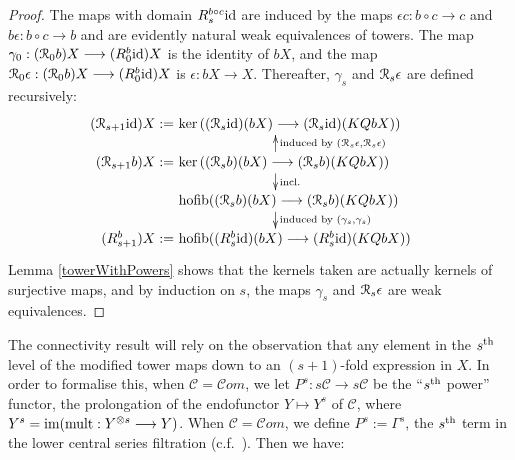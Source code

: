 \documentclass[11pt]{amsart} \renewcommand{\baselinestretch}{1.4}
\theoremstyle{plain}
\theoremstyle{definition}
\renewcommand{\ker}{\mathrm{ker}\,}
\DeclareMathOperator*{\hofib}{hofib}
\renewcommand{\to}{\longrightarrow}
\newcommand{\scrC}{\mathscr{C}}
\newcommand{\calR}{\mathcal{R}}
\newcommand{\calc}{\mathcal{C}}
\newcommand{\Id}{\mathrm{id}}
\newcommand{\algs}{{\scrC\!\textit{om}}}
\newcommand{\algcat}{{\calc}}%
\renewcommand{\mapsto}{\longmapsto}
\newcommand{\caldup}[1]{\calR_{\smash{#1}}}
\newcommand{\plainD}{R}
\newcommand{\barConstructionMightAbbreviate}{b}
\begin{document}
\begin{Bousfield-Kan spectral sequence}
\begin{proof}
The maps with domain $\plainD_{\smash{s}}^{\smash{\barConstructionMightAbbreviate \circ c}}\Id $ are induced by the maps $\epsilon c:\barConstructionMightAbbreviate \circ c\to c$ and $\barConstructionMightAbbreviate \epsilon:\barConstructionMightAbbreviate \circ c\to \barConstructionMightAbbreviate $ and are evidently natural weak equivalences of towers. The map $\gamma_0:(\caldup{0}\barConstructionMightAbbreviate )X\to (\plainD_{\smash{0}}^{\smash{\barConstructionMightAbbreviate }}\Id )X$ is the identity of $\barConstructionMightAbbreviate X$, and the map $\caldup{0}\epsilon:(\caldup{0}\barConstructionMightAbbreviate )X\to (\plainD_{\smash{0}}^{\smash{\barConstructionMightAbbreviate }}\Id )X$ is $\epsilon:\barConstructionMightAbbreviate X\to X$. Thereafter, $\gamma_s$ and $\caldup{s}\epsilon$ are defined recursively:
\[\qquad \quad \xymatrix@R=4mm{
\makebox[0cm][r]{$(\caldup{s+1}\Id )X:=\,$}\makebox[5cm][l]{$\,\ker((\caldup{s}\Id )(\barConstructionMightAbbreviate X)\to (\caldup{s}\Id )(KQ\barConstructionMightAbbreviate X))$}\\
\makebox[0cm][r]{$(\caldup{s+1}\barConstructionMightAbbreviate )X:=\,$}\makebox[5cm][l]{$\,\ker((\caldup{s}\barConstructionMightAbbreviate )(\barConstructionMightAbbreviate X)\to (\caldup{s}\barConstructionMightAbbreviate )(KQ\barConstructionMightAbbreviate X))$}\ar[d]^-{\textup{incl.}}_-{}%
\ar[u]_-{\textup{induced by }(\caldup{s}\epsilon,\caldup{s}\epsilon)}^-{}%
\\%
\makebox[5cm][l]{$\,\hofib((\caldup{s}\barConstructionMightAbbreviate )(\barConstructionMightAbbreviate X)\to(\caldup{s}\barConstructionMightAbbreviate )(KQ\barConstructionMightAbbreviate X))$}\ar[d]^-{\textup{induced by }(\gamma_{s},\gamma_{s})}_-{}%
\\%
\makebox[0cm][r]{$(\plainD_{\smash{s+1}}^{\smash{\barConstructionMightAbbreviate }})X:=\,$}\makebox[5cm][l]{$\,\hofib((\plainD_{\smash{s}}^{\smash{\barConstructionMightAbbreviate }}\Id )(\barConstructionMightAbbreviate X)\to (\plainD_{\smash{s}}^{\smash{\barConstructionMightAbbreviate }}\Id )(KQ\barConstructionMightAbbreviate X))$}%
}\]
\noindent Lemma \ref{towerWithPowers} shows that the kernels taken are actually kernels of surjective maps, and by induction on $s$, the maps $\gamma_s$ and $\caldup{s}\epsilon$ are weak equivalences.
\end{proof}
The connectivity result will rely on the observation that any element in the $s^\textup{th}$ level of the modified tower maps down to an $(s+1)$-fold expression in $X$. In order to formalise this, when $\algcat=\algs$, we let $P^s:s\algcat\to s\algcat$ be the ``$s^\textup{th}$ power'' functor, the prolongation of the endofunctor $Y\mapsto Y^s$ of $\algcat$, where $Y^s=\textup{im}(\textup{mult}:Y^{\otimes s}\to Y)$. When $\algcat=\algs$, we define $P^s:=\Gamma^s$, the $s^\textup{th}$ term in the lower central series filtration (c.f.\ \cite{6Author.pdf}). Then we have:

\end{Bousfield-Kan spectral sequence}
\end{document}
